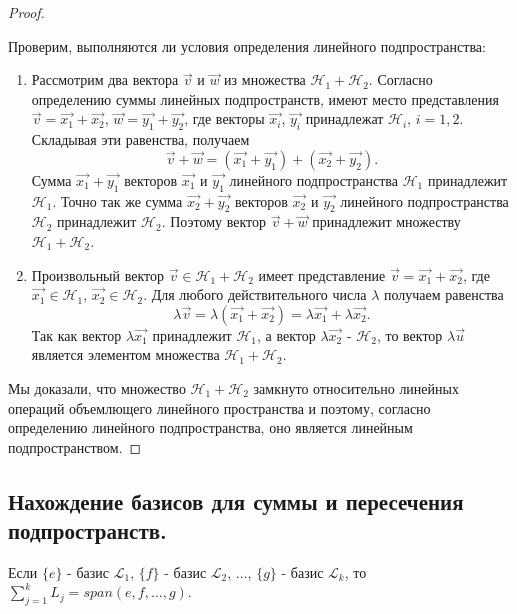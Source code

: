 \begin{proof}~

    Проверим, выполняются ли условия определения линейного подпространства:
    \begin{enumerate}[nosep]
        \item Рассмотрим два вектора $\vec{v}$ и $\vec{w}$ из множества $\mathcal{H}_1 + \mathcal{H}_2$. Согласно определению суммы линейных подпространств, имеют место представления $\vec{v} = \vec{x_1} + \vec{x_2}$, $\vec{w} = \vec{y_1} + \vec{y_2}$, где векторы $\vec{x_i}$, $\vec{y_i}$ принадлежат $\mathcal{H}_i$, $i = 1, 2$. Складывая эти равенства, получаем
        $$\vec{v} + \vec{w} = (\vec{x_1} + \vec{y_1}) + (\vec{x_2} + \vec{y_2}).$$
        Сумма $\vec{x_1} + \vec{y_1}$ векторов $\vec{x_1}$ и $\vec{y_1}$ линейного подпространства $\mathcal{H}_1$ принадлежит $\mathcal{H}_1$. Точно так же сумма $\vec{x_2} + \vec{y_2}$ векторов $\vec{x_2}$ и $\vec{y_2}$ линейного подпространства $\mathcal{H}_2$ принадлежит $\mathcal{H}_2$. Поэтому вектор $\vec{v} + \vec{w}$ принадлежит множеству $\mathcal{H}_1 + \mathcal{H}_2$.
        \item Произвольный вектор $\vec{v} \in \mathcal{H}_1 + \mathcal{H}_2$ имеет представление $\vec{v} = \vec{x_1} + \vec{x_2}$, где $\vec{x_1} \in \mathcal{H}_1$, $\vec{x_2} \in \mathcal{H}_2$. Для любого действительного числа $\lambda$ получаем равенства 
        $$\lambda \vec{v} = \lambda (\vec{x_1} + \vec{x_2}) = \lambda \vec{x_1} + \lambda \vec{x_2}.$$
        Так как вектор $\lambda \vec{x_1}$ принадлежит $\mathcal{H}_1$, а вектор $\lambda \vec{x_2}$ - $\mathcal{H}_2$, то вектор $\lambda \vec{u}$ является элементом множества $\mathcal{H}_1 + \mathcal{H}_2$.
    \end{enumerate}
    Мы доказали, что множество $\mathcal{H}_1 + \mathcal{H}_2$ замкнуто относительно линейных операций объемлющего линейного пространства и поэтому, согласно определению линейного подпространства, оно является линейным подпространством.
\end{proof}


\newpage


\subsection{
    Нахождение базисов для суммы и пересечения подпространств.
}

\begin{theorem}
    Если $\{e\}$ - базис $\mathcal{L}_1$, $\{f\}$ - базис $\mathcal{L}_2$, $\ldots$, $\{g\}$ - базис $\mathcal{L}_k$, то $\sum_{j=1}^{k} L_j = span(e, f, \ldots, g)$.
\end{theorem}

